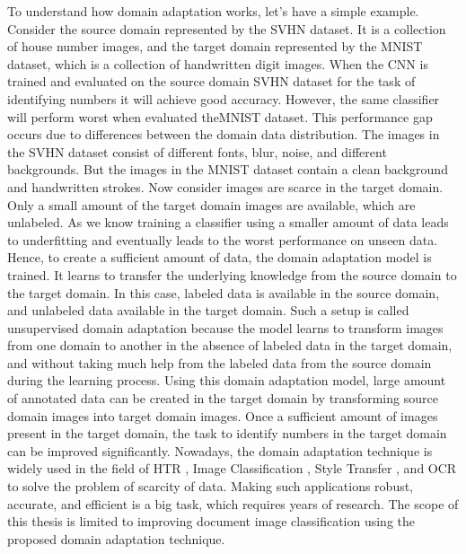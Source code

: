 To understand how domain adaptation works, let's have a simple example. Consider the source domain represented by the \ac{SVHN} dataset. It is a collection of house number images, and the target domain represented by the \ac{MNIST} dataset, which is a collection of handwritten digit images.  When the \ac{CNN} is trained and evaluated on the source domain \ac{SVHN} dataset for the task of identifying numbers it will achieve good accuracy. However, the same classifier will perform worst when evaluated the\ac{MNIST} dataset. This performance gap occurs due to differences between the domain data distribution. The images in the \ac{SVHN} dataset consist of different fonts, blur, noise, and different backgrounds. But the images in the \ac{MNIST} dataset contain a clean background and handwritten strokes. Now consider images are scarce in the target domain. Only a small amount of the target domain images are available, which are unlabeled. As we know training a classifier using a smaller amount of data leads to underfitting and eventually leads to the worst performance on unseen data. Hence, to create a sufficient amount of data, the domain adaptation model is trained. It learns to transfer the underlying knowledge from the source domain to the target domain. In this case, labeled data is available in the source domain, and unlabeled data available in the target domain. Such a setup is called unsupervised domain adaptation because the model learns to transform images from one domain to another in the absence of labeled data in the target domain, and without taking much help from the labeled data from the source domain during the learning process. Using this domain adaptation model, large amount of annotated data can be created in the target domain by transforming source domain images into target domain images. Once a sufficient amount of images present in the target domain, the task to identify numbers in the target domain can be improved significantly. Nowadays, the domain adaptation technique is widely used in the field of \ac{HTR} \cite{Kang_2020}, Image Classification \cite{5288526}, Style Transfer \cite{johnson2016perceptual}, and \ac{OCR} \cite{8978011} to solve the problem of scarcity of data. Making such applications robust, accurate, and efficient is a big task, which requires years of research. The scope of this thesis is limited to improving document image classification using the proposed domain adaptation technique.

